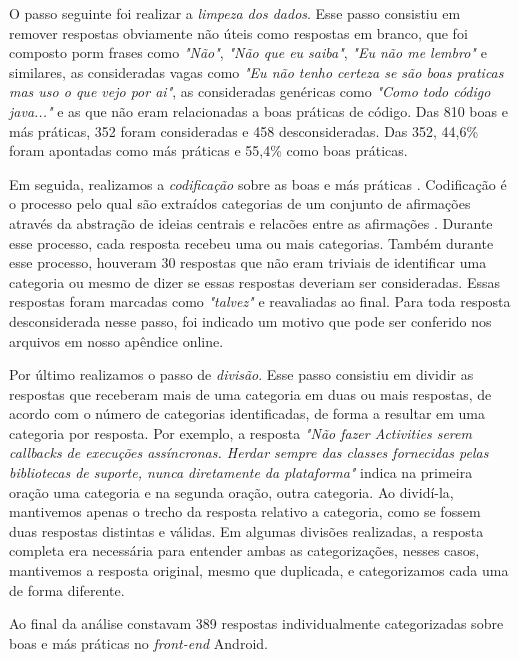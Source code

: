 O passo seguinte foi realizar a \textit{limpeza dos dados}. Esse passo consistiu em remover respostas obviamente não úteis como respostas em branco, que foi composto porm frases como \textit{"Não"}, \textit{"Não que eu saiba"}, \textit{"Eu não me lembro"} e similares, as consideradas vagas como \textit{"Eu não tenho certeza se são boas praticas mas uso o que vejo por ai"}, as consideradas genéricas como \textit{"Como todo código java..."} e as que não eram relacionadas a boas práticas de código. Das 810 boas e más práticas, 352 foram consideradas e 458 desconsideradas. Das 352, 44,6\% foram apontadas como más práticas e 55,4\% como boas práticas. 

Em seguida, realizamos a \textit{codificação} sobre as boas e más práticas \cite{Strauss2007,Saldana2013}. Codificação é o processo pelo qual são extraídos categorias de um conjunto de afirmações através da abstração de ideias centrais e relacões entre as afirmações \cite{Strauss2007}. Durante esse processo, cada resposta recebeu uma ou mais categorias. Também durante esse processo, houveram 30 respostas que não eram triviais de identificar uma categoria ou mesmo de dizer se essas respostas deveriam ser consideradas. Essas respostas foram marcadas como \textit{"talvez"} e reavaliadas ao final. Para toda resposta desconsiderada nesse passo, foi indicado um motivo que pode ser conferido nos arquivos em nosso apêndice online.

Por último realizamos o passo de \textit{divisão}. Esse passo consistiu em dividir as respostas que receberam mais de uma categoria em duas ou mais respostas, de acordo com o número de categorias identificadas, de forma a resultar em uma categoria por resposta. Por exemplo, a resposta \textit{"Não fazer Activities serem callbacks de execuções assíncronas. Herdar sempre das classes fornecidas pelas bibliotecas de suporte, nunca diretamente da plataforma"} indica na primeira oração uma categoria e na segunda oração, outra categoria. Ao dividí-la, mantivemos apenas o trecho da resposta relativo a categoria, como se fossem duas respostas distintas e válidas. Em algumas divisões realizadas, a resposta completa era necessária para entender ambas as categorizações, nesses casos, mantivemos a resposta original, mesmo que duplicada, e categorizamos cada uma de forma diferente. 

Ao final da análise constavam 389 respostas individualmente categorizadas sobre boas e más práticas no \textit{front-end} Android.




